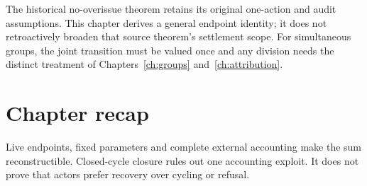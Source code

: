 The historical no-overissue theorem retains its original one-action and
audit assumptions. This chapter derives a general endpoint identity; it
does not retroactively broaden that source theorem's settlement scope.
For simultaneous groups, the joint transition must be valued once and any
division needs the distinct treatment of Chapters~\ref{ch:groups} and~\ref{ch:attribution}.

\section*{Chapter recap}
Live endpoints, fixed parameters and complete external accounting make the
sum reconstructible. Closed-cycle closure rules out one accounting exploit.
It does not prove that actors prefer recovery over cycling or refusal.
